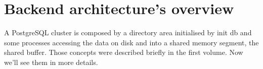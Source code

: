 \chapter{Backend architecture's overview}
A PostgreSQL cluster is composed by a directory area initialised by init db and some processes 
accessing the data on disk and into a shared memory segment, the shared buffer. Those concepts were 
described briefly in the first volume. Now we'll see them in more details.




